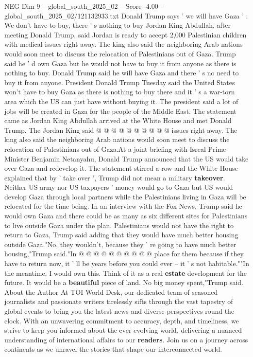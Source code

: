 \begin{textsample}{NEG Dim 9 – global\_south\_2025\_02 – Score -4.00 – global\_south\_2025\_02/121132933.txt}  \label{ex:f9_neg_059}
Donald Trump says ' we will have Gaza ' : We don't have to buy, there ' s nothing to buy Jordan King Abdullah, after meeting Donald Trump, said Jordan is ready to accept 2,000 Palestinian children with medical issues right away.
The king also said the neighboring Arab nations would soon meet to discuss the relocation of Palestinians out of Gaza.
Trump said he ' d own Gaza but he would not have to buy it from anyone as there is nothing to buy.
Donald Trump said he will have Gaza and there ' s no need to buy it from anyone.
President Donald Trump Tuesday said the United States won't have to buy Gaza as there is nothing to buy there and it ' s a war-torn area which the US can just have without buying it.
The president said a lot of jobs will be created in Gaza for the people of the Middle East.
The statement came as Jordan King Abdullah arrived at the White House and met Donald Trump.
The Jordan King said @ @ @ @ @ @ @ @ @ @ issues right away.
The king also said the neighboring Arab nations would soon meet to discuss the relocation of Palestinians out of Gaza.At a joint briefing with Isreal Prime Minister Benjamin Netanyahu, Donald Trump announced that the US would take over Gaza and redevelop it.
The statement stirred a row and the White House explained that by ' take over ', Trump did not mean a military \textbf{takeover}.
Neither US army nor US taxpayers ' money would go to Gaza but US would develop Gaza through local partners while the Palestinians living in Gaza will be relocated for the time being.
In an interview with the Fox News, Trump said he would own Gaza and there could be as many as six different sites for Palestinians to live outside Gaza under the plan.
Palestinians would not have the right to return to Gaza, Trump said adding that they would have much better housing outside Gaza."No, they wouldn't, because they ' re going to have much better housing,"Trump said."In @ @ @ @ @ @ @ @ @ @ place for them because if they have to return now, it ' ll be years before you could ever -- it ' s not habitable.""In the meantime, I would own this.
Think of it as a real \textbf{estate} development for the future.
It would be a \textbf{beautiful} piece of land.
No big money spent,"Trump said.
About the Author At TOI World Desk, our dedicated team of seasoned journalists and passionate writers tirelessly sifts through the vast tapestry of global events to bring you the latest news and diverse perspectives round the clock.
With an unwavering commitment to accuracy, depth, and timeliness, we strive to keep you informed about the ever-evolving world, delivering a nuanced understanding of international affairs to our \textbf{readers}.
Join us on a journey across continents as we unravel the stories that shape our interconnected world.

\end{textsample}

